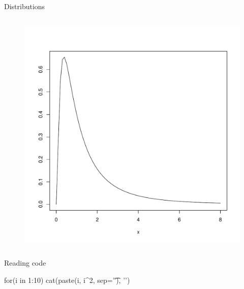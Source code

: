 \documentclass[pdf]{beamer}
\newcommand\subHeading[1]{
  \par\bigskip {\Large\bfseries#1}\par\smallskip
}
\begin{document}
\begin{frame}{Distributions}
\begin{columns}
\begin{column}{0.5\textwidth}
\begin{figure}[ht]
      \includegraphics[width=\textwidth]{images/log_normal.pdf}
      \end{figure}
    \end{column}
  \end{columns}
\end{frame}

\begin{frame}[fragile]{Reading code}
  \subHeading{Perl}
  \subHeading{R}
  \begin{rcode}
    for(i in 1:10){
      cat(paste(i, i^2, sep='\t'), '\n')
    }
  \end{rcode}
\end{frame}
\end{document}
